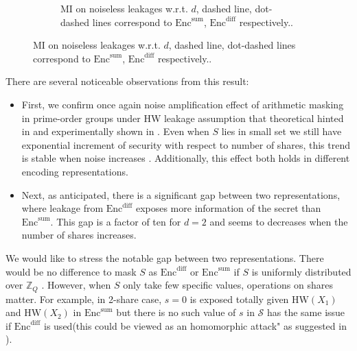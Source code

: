 \documentclass{llncs}
\begin{document}
\begin{figure}[h]
\begin{subfigure}{0.5\textwidth}
	\caption{MI on noiseless leakages w.r.t. $d$, dashed line, dot-dashed lines correspond to $\text{Enc}^{\text{sum}}$, $\text{Enc}^{\text{diff}}$ respectively..}\label{fig:milines}
	\end{subfigure}
	\label{fig:image2}
\end{figure}

There are several noticeable observations from this result:
\begin{itemize}
	\item First, we confirm once again noise amplification effect of arithmetic masking in prime-order groups under HW leakage assumption that theoretical hinted in \cite{optimalmask} and experimentally shown in \cite{primemask}. Even when $S$ lies in small set we still have exponential increment of security with respect to number of shares, this trend is stable when noise increases . Additionally, this effect both holds in different encoding representations. 
	\item Next, as anticipated, there is a significant gap between two representations, where leakage from $\text{Enc}^{\text{diff}}$ exposes more information of the secret than $\text{Enc}^{\text{sum}}$. This gap is a factor of ten for $d=2$ and seems to decreases when the number of shares increases.
\end{itemize}
We would like to stress the notable gap between two representations. There would be no difference to mask $S$ as $\text{Enc}^{\text{diff}}$  or $\text{Enc}^{\text{sum}}$  if $S$ is uniformly distributed over $\mathbb{Z}_Q$ . However, when $S$ only take few specific values, operations on shares matter. For example, in 2-share case, $s=0$ is exposed totally given $\text{HW}(X_1)$ and $\text{HW}(X_2)$ in  $\text{Enc}^{\text{sum}}$ but there is no such value of $s$ in $\mathcal{S}$ has the same issue if $\text{Enc}^{\text{diff}}$ is used(this could be viewed as an homomorphic attack" as suggested in \cite{optimalmask}).
\end{document}
